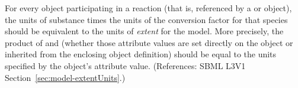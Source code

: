 For every \Species object participating in a reaction (that is, referenced
by a \SpeciesReference or \ModifierSpeciesReference object), the units of
substance times the units of the conversion factor for that species should
be equivalent to the units of \emph{extent} for the model.  More precisely,
the product of  and  (whether
those attribute values are set directly on the \Species object or inherited
from the enclosing \Model object definition) should be equal to the units
specified by the \Model object's  attribute value.
(References: SBML L3V1 Section~\ref{sec:model-extentUnits}.)
